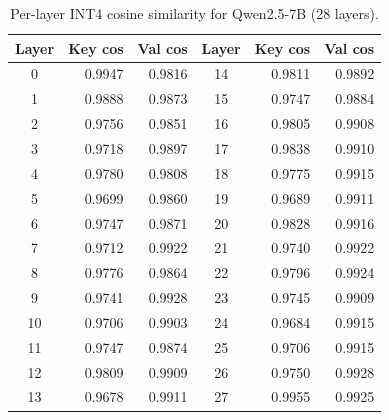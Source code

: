 \documentclass[11pt]{article}
\theoremstyle{plain}
\theoremstyle{definition}
\begin{document}
\begin{table}[H]
\centering
\caption{Per-layer INT4 cosine similarity for Qwen2.5-7B (28 layers).}
\label{tab:per-layer-qwen}
\small
\begin{tabular}{crr|crr}
\toprule
Layer & Key cos & Val cos & Layer & Key cos & Val cos \\
\midrule
0 & 0.9947 & 0.9816 & 14 & 0.9811 & 0.9892 \\
1 & 0.9888 & 0.9873 & 15 & 0.9747 & 0.9884 \\
2 & 0.9756 & 0.9851 & 16 & 0.9805 & 0.9908 \\
3 & 0.9718 & 0.9897 & 17 & 0.9838 & 0.9910 \\
4 & 0.9780 & 0.9808 & 18 & 0.9775 & 0.9915 \\
5 & 0.9699 & 0.9860 & 19 & 0.9689 & 0.9911 \\
6 & 0.9747 & 0.9871 & 20 & 0.9828 & 0.9916 \\
7 & 0.9712 & 0.9922 & 21 & 0.9740 & 0.9922 \\
8 & 0.9776 & 0.9864 & 22 & 0.9796 & 0.9924 \\
9 & 0.9741 & 0.9928 & 23 & 0.9745 & 0.9909 \\
10 & 0.9706 & 0.9903 & 24 & 0.9684 & 0.9915 \\
11 & 0.9747 & 0.9874 & 25 & 0.9706 & 0.9915 \\
12 & 0.9809 & 0.9909 & 26 & 0.9750 & 0.9928 \\
13 & 0.9678 & 0.9911 & 27 & 0.9955 & 0.9925 \\
\bottomrule
\end{tabular}
\end{table}
\end{document}
